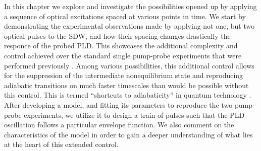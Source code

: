 In this chapter we explore and investigate the possibilities opened up by applying a sequence of optical excitations spaced at various points in time.
We start by demonstrating the experimental observations made by applying not one, but two optical pulses to the SDW, and how their spacing changes drastically the responce of the probed PLD.
This showcases the additional complexity and control achieved over the standard single pump-probe experiments that were performed previously \cite{Singer2015prb, Singer2015prb}. 
Among various possibilities, this additional control allows for the suppression of the intermediate nonequilibrium state and reproducing adiabatic transitions on much faster timescales than would be possible without this control.
This is termed ``shortcuts to adiabaticity'' in quantum technology \cite{Torrontegui2013,Deffner2014,Zhou2017}.
After developing a model, and fitting its parameters to reproduce the two pump-probe experiments, we utilize it to design a train of pulses such that the PLD oscillation follows a particular envelope function.
We also comment on the characteristics of the model in order to gain a deeper understanding of what lies at the heart of this extended control. 

